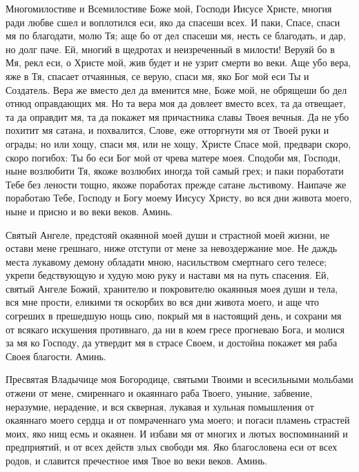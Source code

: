 Многомилостиве и Всемилостиве Боже мой, Господи Иисусе Христе, многия ради любве сшел и воплотился еси, яко да спасеши всех. И паки, Спасе, спаси мя по благодати, молю Тя; аще бо от дел спасеши мя, несть се благодать, и дар, но долг паче. Ей, многий в щедротах и неизреченный в милости! Веруяй бо в Мя, рекл еси, о Христе мой, жив будет и не узрит смерти во веки. Аще убо вера, яже в Тя, спасает отчаянныя, се верую, спаси мя, яко Бог мой еси Ты и Создатель. Вера же вместо дел да вменится мне, Боже мой, не обрящеши бо дел отнюд оправдающих мя. Но та вера моя да довлеет вместо всех, та да отвещает, та да оправдит мя, та да покажет мя причастника славы Твоея вечныя. Да не убо похитит мя сатана, и похвалится, Слове, еже отторгнути мя от Твоей руки и ограды; но или хощу, спаси мя, или не хощу, Христе Спасе мой, предвари скоро, скоро погибох: Ты бо еси Бог мой от чрева матере моея. Сподоби мя, Господи, ныне возлюбити Тя, якоже возлюбих иногда той самый грех; и паки поработати Тебе без лености тощно, якоже поработах прежде сатане льстивому. Наипаче же поработаю Тебе, Господу и Богу моему Иисусу Христу, во вся дни живота моего, ныне и присно и во веки веков. Аминь. 




Святый Ангеле, предстояй окаянной моей души и страстной моей жизни, не остави мене грешнаго, ниже отступи от мене за невоздержание мое. Не даждь места лукавому демону обладати мною, насильством смертнаго сего телесе; укрепи бедствующую и худую мою руку и настави мя на путь спасения. Ей, святый Ангеле Божий, хранителю и покровителю окаянныя моея души и тела, вся мне прости, еликими тя оскорбих во вся дни живота моего, и аще что согреших в прешедшую нощь сию, покрый мя в настоящий день, и сохрани мя от всякаго искушения противнаго, да ни в коем гресе прогневаю Бога, и молися за мя ко Господу, да утвердит мя в страсе Своем, и достойна покажет мя раба Своея благости. Аминь. 




Пресвятая Владычице моя Богородице, святыми Твоими и всесильными мольбами отжени от мене, смиреннаго и окаяннаго раба Твоего, уныние, забвение, неразумие, нерадение, и вся скверная, лукавая и хульная помышления от окаяннаго моего сердца и от помраченнаго ума моего; и погаси пламень страстей моих, яко нищ есмь и окаянен. И избави мя от многих и лютых воспоминаний и предприятий, и от всех действ злых свободи мя. Яко благословена еси от всех родов, и славится пречестное имя Твое во веки веков. Аминь. 


